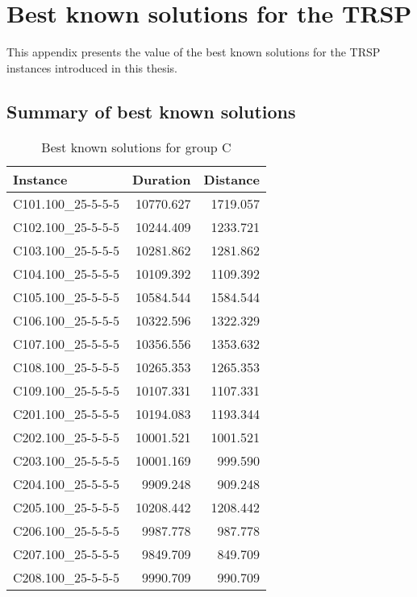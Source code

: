 \chapter{Best known solutions for the TRSP}\label{ap:bks}
This appendix presents the value of the best known solutions for the TRSP instances introduced in this thesis.
\newpage
\section{Summary of best known solutions}
\begin{table}
\begin{tabular}{lrr}
\hline
 \textbf{Instance} & \textbf{Duration} & \textbf{Distance} \\
\hline
C101.100_25-5-5-5 &    10770.627 &     1719.057 \\ 
C102.100_25-5-5-5 &    10244.409 &     1233.721 \\ 
C103.100_25-5-5-5 &    10281.862 &     1281.862 \\ 
C104.100_25-5-5-5 &    10109.392 &     1109.392 \\ 
C105.100_25-5-5-5 &    10584.544 &     1584.544 \\ 
C106.100_25-5-5-5 &    10322.596 &     1322.329 \\ 
C107.100_25-5-5-5 &    10356.556 &     1353.632 \\ 
C108.100_25-5-5-5 &    10265.353 &     1265.353 \\ 
C109.100_25-5-5-5 &    10107.331 &     1107.331 \\ 
C201.100_25-5-5-5 &    10194.083 &     1193.344 \\ 
C202.100_25-5-5-5 &    10001.521 &     1001.521 \\ 
C203.100_25-5-5-5 &    10001.169 &      999.590 \\ 
C204.100_25-5-5-5 &     9909.248 &      909.248 \\ 
C205.100_25-5-5-5 &    10208.442 &     1208.442 \\ 
C206.100_25-5-5-5 &     9987.778 &      987.778 \\ 
C207.100_25-5-5-5 &     9849.709 &      849.709 \\ 
C208.100_25-5-5-5 &     9990.709 &      990.709 \\ 
\hline
\end{tabular}
\caption{Best known solutions for group C} \label{tab:ap-bks-C}
\end{table}
